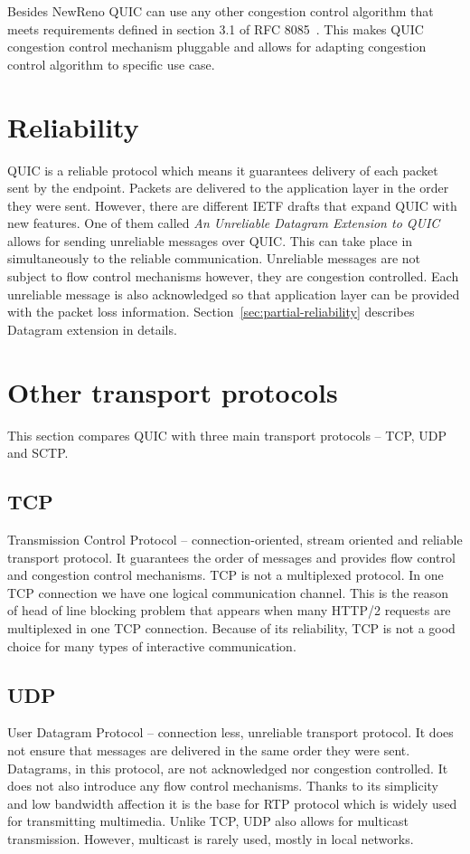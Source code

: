 Besides NewReno QUIC can use any other congestion control algorithm that meets requirements defined in section 3.1 of RFC 8085~\cite{rfc8085}.
This makes QUIC congestion control mechanism pluggable and allows for adapting congestion control algorithm to specific use case.


\section{Reliability}
\label{sec:reliability}
QUIC is a reliable protocol which means it guarantees delivery of each packet sent by the endpoint.
Packets are delivered to the application layer in the order they were sent.
However, there are different IETF drafts that expand QUIC with new features.
One of them called \textit{An Unreliable Datagram Extension to QUIC}\cite{bider-ssh-quic-09} allows for sending unreliable messages over QUIC\@.
This can take place in simultaneously to the reliable communication.
Unreliable messages are not subject to flow control mechanisms however, they are congestion controlled.
Each unreliable message is also acknowledged so that application layer can be provided with the packet loss information.
Section~\ref{sec:partial-reliability} describes Datagram extension in details.


\section{Other transport protocols}
\label{sec:other-transport-protocols}
This section compares QUIC with three main transport protocols -- TCP, UDP and SCTP\@.

\subsection{TCP}
\label{subsec:tcp}
Transmission Control Protocol -- connection-oriented, stream oriented and reliable transport protocol.
It guarantees the order of messages and provides flow control and congestion control mechanisms.
TCP is not a multiplexed protocol.
In one TCP connection we have one logical communication channel.
This is the reason of head of line blocking problem that appears when many HTTP/2 requests are multiplexed in one TCP connection.
Because of its reliability, TCP is not a good choice for many types of interactive communication.

\subsection{UDP}
\label{subsec:udp}
User Datagram Protocol -- connection less, unreliable transport protocol.
It does not ensure that messages are delivered in the same order they were sent.
Datagrams, in this protocol, are not acknowledged nor congestion controlled.
It does not also introduce any flow control mechanisms.
Thanks to its simplicity and low bandwidth affection it is the base for RTP protocol which is widely used for transmitting multimedia.
Unlike TCP, UDP also allows for multicast transmission.
However, multicast is rarely used, mostly in local networks.

